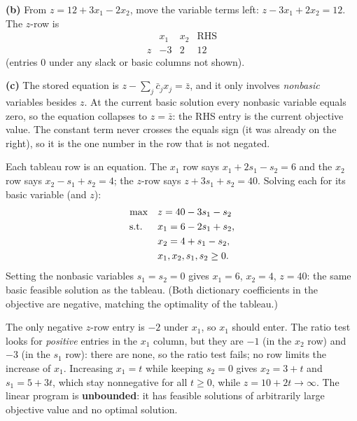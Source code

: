 \textbf{(b)} From $z = 12 + 3x_1 - 2x_2$, move the variable terms left:
$z - 3x_1 + 2x_2 = 12$. The $z$-row is
\[
\begin{array}{c|cc|c}
 & x_1 & x_2 & \text{RHS} \\
\hline
z & -3 & 2 & 12
\end{array}
\]
(entries $0$ under any slack or basic columns not shown).

\textbf{(c)} The stored equation is $z - \sum_j \bar c_j x_j = \bar z$,
and it only involves \emph{nonbasic} variables besides $z$. At the
current basic solution every nonbasic variable equals zero, so the
equation collapses to $z = \bar z$: the RHS entry is the current
objective value. The constant term never crosses the equals sign (it was
already on the right), so it is the one number in the row that is not
negated.


Each tableau row is an equation. The $x_1$ row says
$x_1 + 2s_1 - s_2 = 6$ and the $x_2$ row says $x_2 - s_1 + s_2 = 4$;
the $z$-row says $z + 3s_1 + s_2 = 40$. Solving each for its basic
variable (and $z$):
\[
\begin{aligned}
\max\quad & z = 40 - 3s_1 - s_2 \\
\text{s.t.}\;\;\quad & x_1 = 6 - 2s_1 + s_2, \\
& x_2 = 4 + s_1 - s_2, \\
& x_1, x_2, s_1, s_2 \geq 0.
\end{aligned}
\]
Setting the nonbasic variables $s_1 = s_2 = 0$ gives $x_1 = 6$,
$x_2 = 4$, $z = 40$: the same basic feasible solution as the tableau.
(Both dictionary coefficients in the objective are negative, matching the
optimality of the tableau.)


The only negative $z$-row entry is $-2$ under $x_1$, so $x_1$ should
enter. The ratio test looks for \emph{positive} entries in the $x_1$
column, but they are $-1$ (in the $x_2$ row) and $-3$ (in the $s_1$
row): there are none, so the ratio test fails; no row limits the
increase of $x_1$. Increasing $x_1 = t$ while keeping $s_2 = 0$ gives
$x_2 = 3 + t$ and $s_1 = 5 + 3t$, which stay nonnegative for all
$t \geq 0$, while $z = 10 + 2t \to \infty$. The linear program is
\textbf{unbounded}: it has feasible solutions of arbitrarily large
objective value and no optimal solution.


